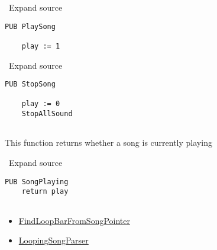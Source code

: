 
\textbf{} ~Expand source

\lstset{style=spin}
\begin{lstlisting}
PUB PlaySong

    play := 1
\end{lstlisting}


\textbf{} ~Expand source

\lstset{style=spin}
\begin{lstlisting}
PUB StopSong

    play := 0
    StopAllSound
    
\end{lstlisting}


This function returns whether a song is currently playing

\textbf{} ~Expand source

\lstset{style=spin}
\begin{lstlisting}
PUB SongPlaying
    return play
        
\end{lstlisting}


\begin{itemize}
\itemsep1pt\parskip0pt
\item
  \hyperref[LameAudio.spin-FindLoopBarFromSongPointer]{FindLoopBarFromSongPointer}
\item
  \hyperref[LameAudio.spin-LoopingSongParser]{LoopingSongParser}
\end{itemize}

